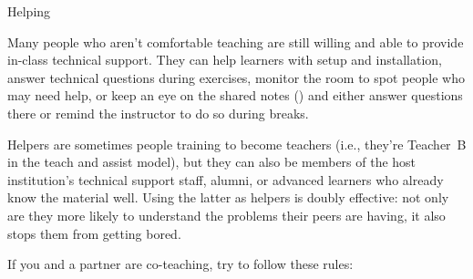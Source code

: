 \begin{callout}{Helping}

  Many people who aren't comfortable teaching are still willing and
  able to provide in-class technical support.  They can help learners
  with setup and installation, answer technical questions during
  exercises, monitor the room to spot people who may need help, or
  keep an eye on the shared notes ()
  and either answer questions there or remind the instructor to do so
  during breaks.

  Helpers are sometimes people training to become teachers (i.e.,
  they're Teacher~B in the teach and assist model), but they can also
  be members of the host institution's technical support staff,
  alumni, or advanced learners who already know the material well.
  Using the latter as helpers is doubly effective: not only are they
  more likely to understand the problems their peers are having, it
  also stops them from getting bored.

\end{callout}

If you and a partner are co-teaching, try to follow these rules:

